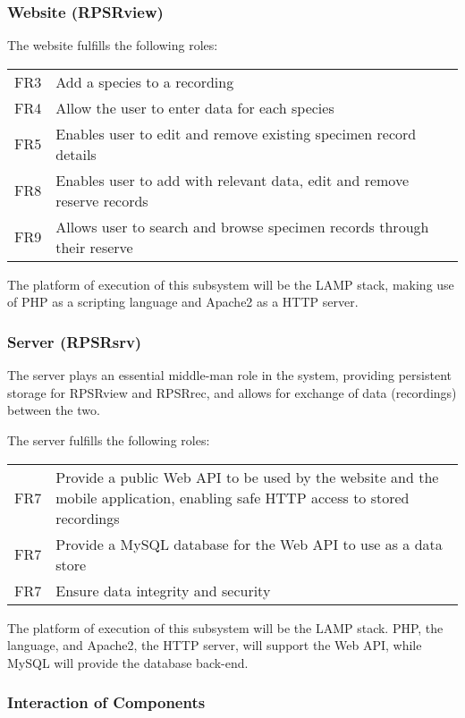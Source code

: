 \subsubsection{Website (RPSRview)}
    The website fulfills the following roles:\\
    	\begin{tabular}{r | p{15cm}}
    		FR3 & Add a species to a recording \\
    		FR4 & Allow the user to enter data for each species\\
			FR5 & Enables user to edit and remove existing specimen record details \\
        	FR8 & Enables user to add with relevant data, edit and remove reserve records \\
    		FR9 & Allows user to search and browse specimen records through their reserve \\
        \end{tabular}
    The platform of execution of this subsystem will be the LAMP stack, making use of PHP as a scripting language and Apache2 as a HTTP server.
        
\subsubsection{Server (RPSRsrv)}
    The server plays an essential middle-man role in the system, providing persistent storage for RPSRview and RPSRrec,
    and allows for exchange of data (recordings) between the two. 

    The server fulfills the following roles:\\
    \begin{tabular}{r | p{15cm}}
        FR7 & Provide a public Web API to be used by the website and the mobile application, enabling safe HTTP access to stored recordings \\
        FR7 & Provide a MySQL database for the Web API to use as a data store \\
        FR7 & Ensure data integrity and security \\
	\end{tabular}
    The platform of execution of this subsystem will be the LAMP stack. PHP, the language, and Apache2, the HTTP server, will support the Web API, while MySQL will provide the database back-end.

\subsubsection{Interaction of Components}
	

